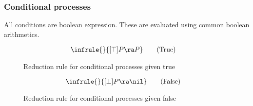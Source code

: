 

\FloatBarrier

\subsubsection{Conditional processes}
All conditions are boolean expression. These are evaluated using common boolean arithmetics.

\begin{figure}[h]
	\begin{align}
	& \infrule{}{[\top]P\ra P} \tag{True}
	\end{align}
	\caption{Reduction rule for conditional processes given true}
	\label{fig:true}
\end{figure}

\begin{figure}[h]
	\begin{align}
	& \infrule{}{[\bot]P\ra \nil} \tag{False}
	\end{align}
	\caption{Reduction rule for conditional processes given false}
	\label{fig:true}
\end{figure}

\FloatBarrier



